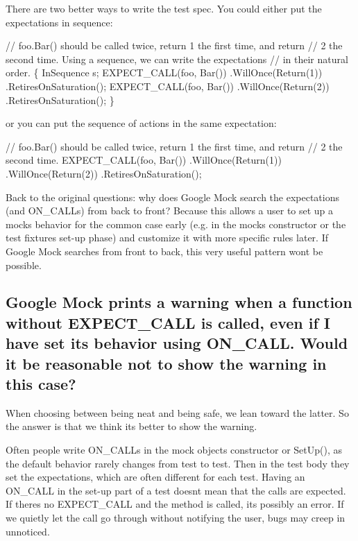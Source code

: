 There are two better ways to write the test spec. You could either put the expectations in sequence\+:


\begin{DoxyCode}
// foo.Bar() should be called twice, return 1 the first time, and return
// 2 the second time.  Using a sequence, we can write the expectations
// in their natural order.
\{
  InSequence s;
  EXPECT\_CALL(foo, Bar())
      .WillOnce(Return(1))
      .RetiresOnSaturation();
  EXPECT\_CALL(foo, Bar())
      .WillOnce(Return(2))
      .RetiresOnSaturation();
\}
\end{DoxyCode}


or you can put the sequence of actions in the same expectation\+:


\begin{DoxyCode}
// foo.Bar() should be called twice, return 1 the first time, and return
// 2 the second time.
EXPECT\_CALL(foo, Bar())
    .WillOnce(Return(1))
    .WillOnce(Return(2))
    .RetiresOnSaturation();
\end{DoxyCode}


Back to the original questions\+: why does Google Mock search the expectations (and {\ttfamily O\+N\+\_\+\+C\+A\+LL}s) from back to front? Because this allows a user to set up a mock\textquotesingle{}s behavior for the common case early (e.\+g. in the mock\textquotesingle{}s constructor or the test fixture\textquotesingle{}s set-\/up phase) and customize it with more specific rules later. If Google Mock searches from front to back, this very useful pattern won\textquotesingle{}t be possible.

\subsection*{Google Mock prints a warning when a function without E\+X\+P\+E\+C\+T\+\_\+\+C\+A\+LL is called, even if I have set its behavior using O\+N\+\_\+\+C\+A\+LL. Would it be reasonable not to show the warning in this case?}

When choosing between being neat and being safe, we lean toward the latter. So the answer is that we think it\textquotesingle{}s better to show the warning.

Often people write {\ttfamily O\+N\+\_\+\+C\+A\+LL}s in the mock object\textquotesingle{}s constructor or {\ttfamily Set\+Up()}, as the default behavior rarely changes from test to test. Then in the test body they set the expectations, which are often different for each test. Having an {\ttfamily O\+N\+\_\+\+C\+A\+LL} in the set-\/up part of a test doesn\textquotesingle{}t mean that the calls are expected. If there\textquotesingle{}s no {\ttfamily E\+X\+P\+E\+C\+T\+\_\+\+C\+A\+LL} and the method is called, it\textquotesingle{}s possibly an error. If we quietly let the call go through without notifying the user, bugs may creep in unnoticed.


